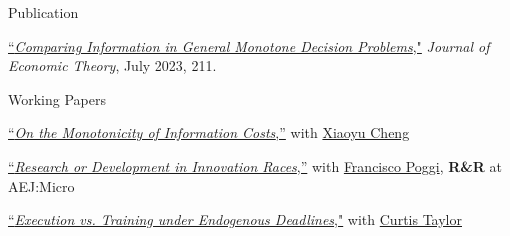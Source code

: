 \begin{rSection}{Publication}
	
	\begin{etaremune}
		\item \href{https://yonggyun-yg-kim.github.io/files/Research%20papers/GMDP_JET.pdf}{``\textit{Comparing Information in General Monotone Decision Problems},"} 
		\textit{Journal of Economic Theory}, July 2023, 211. 
		
	\end{etaremune}
	
	
	
\end{rSection}

\begin{rSection}{Working Papers}
	
	\begin{etaremune}
		
		\item
		 \href{https://yonggyun-yg-kim.github.io/files/Research%20papers/BLmonotonicity.pdf}{``\textit{On the Monotonicity of Information Costs},''} with \href{https://xiaoyu-cheng.com/}{Xiaoyu Cheng}
		
		\item \href{https://yonggyun-yg-kim.github.io/files/Research%20papers/RDIR.pdf}{``\textit{Research or Development in Innovation Races},''}   with \href{https://www.franciscopoggi.com/}{Francisco Poggi}, \textbf{R\&R} at AEJ:Micro
		
		\item \href{https://yonggyun-yg-kim.github.io/files/Research%20papers/Execution-v-Training.pdf}{``\textit{Execution vs. Training under Endogenous Deadlines},"} with \href{https://sites.google.com/view/curtistaylor/home}{Curtis Taylor}

	\end{etaremune}
	
	
\end{rSection}


